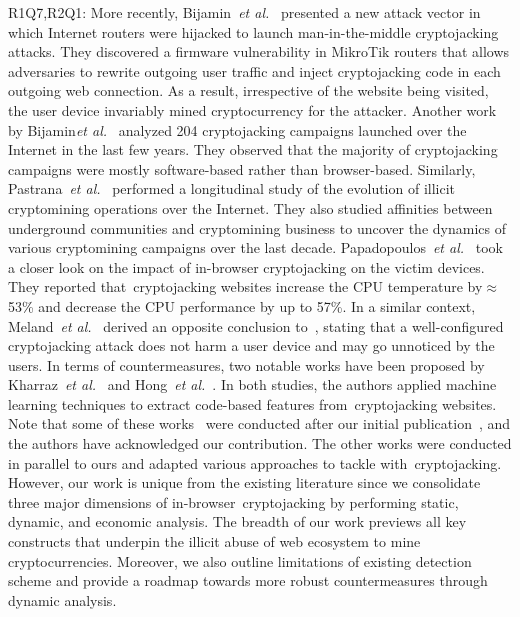 \documentclass[acmlarge]{acmart}
\newcommand{\cc}{{cryptocurrency}\xspace}
\newcommand{\cj}{cryptojacking\xspace}
\newcommand{\etal}{{\em et al.}\xspace}
\begin{document}
{\color{blue}R1Q7,R2Q1: More recently, Bijamin~\etal~\cite{BijmansBDCCS19} presented a new attack vector in which Internet routers were hijacked to launch man-in-the-middle \cj attacks. They discovered a firmware vulnerability in MikroTik routers that allows adversaries to rewrite outgoing user traffic and inject cryptojacking code in each outgoing web connection. As a result, irrespective of the website being visited, the user device invariably mined \cc for the attacker. Another work by Bijamin\etal~\cite{BijmansBD19} analyzed 204 \cj campaigns launched over the Internet in the last few years. They observed that the majority of \cj campaigns were mostly software-based rather than browser-based. Similarly, Pastrana~\etal~\cite{PastranaS19} performed a longitudinal study of the evolution of illicit cryptomining operations over the Internet. They also studied affinities between underground communities and cryptomining business to uncover the dynamics of various cryptomining campaigns over the last decade. Papadopoulos~\etal~\cite{PapadopoulosIM19} took a closer look on the impact of in-browser \cj on the victim devices. They reported that~\cj websites increase the CPU temperature by$\approx$53\% and decrease the CPU performance by up to 57\%. In a similar context, Meland~\etal~\cite{MelandJS19} derived an opposite conclusion to~\cite{PapadopoulosIM19}, stating that a well-configured \cj attack does not harm a user device and may go unnoticed by the users. In terms of countermeasures, two notable works have been proposed by Kharraz~\etal~\cite{KharrazMMLMMBAB19} and Hong~\etal~\cite{HongZSLYZMYZH18}. In both studies, the authors applied machine learning techniques to extract code-based features from~\cj websites. Note that some of these works~\cite{PastranaS19,BijmansBD19} were conducted after our initial publication~\cite{SaadKM19}, and the authors have acknowledged our contribution. The other works were conducted in parallel to ours and adapted various approaches to tackle with~\cj.  However, our work is unique from the existing literature since we consolidate three major dimensions of in-browser~\cj by performing static, dynamic, and economic analysis. The breadth of our work previews all key constructs that underpin the illicit abuse of web ecosystem to mine cryptocurrencies. Moreover, we also outline limitations of existing detection scheme and provide a roadmap towards more robust countermeasures through dynamic analysis.  }   
\end{document}
